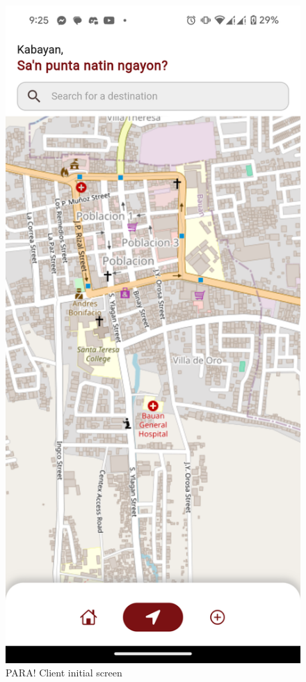 \documentclass[journal]{./IEEE/IEEEtran}
\begin{document}
\begin{description}
\begin{figure}[!h]
    \centering
        \includegraphics[scale=0.1]{./figures/client/welcome.png}
    \caption{PARA! Client initial screen}
\end{figure}


\end{description}
\end{document}
